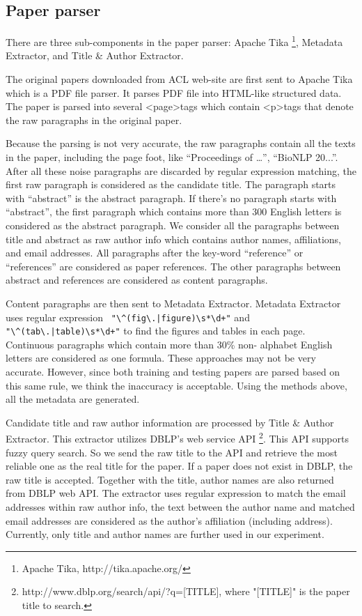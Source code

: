 \documentclass[11pt,letterpaper]{article}
\begin{document}
\subsection{Paper parser}

There are three sub-components in the paper parser: Apache Tika \footnote{Apache Tika, http://tika.apache.org/}, Metadata Extractor, and Title \& Author Extractor. 

The original papers downloaded from ACL web-site are first sent to Apache Tika which is a PDF file parser. It parses PDF file into HTML-like structured data. The paper is parsed into several \textless page\textgreater tags which contain \textless p\textgreater tags that denote the raw paragraphs in the original paper. 

Because the parsing is not very accurate, the raw paragraphs contain all the texts in the paper, including the page foot, like ``Proceedings of …'', ``BioNLP 20...''. After all these noise paragraphs are discarded by regular expression matching, the first raw paragraph is considered as the candidate title. The paragraph starts with ``abstract'' is the abstract paragraph. If there's no paragraph starts with ``abstract'', the first paragraph which contains more than 300 English letters is considered as the abstract paragraph. 
We consider all the paragraphs between title and abstract as raw author info which contains author names, affiliations, and email addresses. All paragraphs after the key-word ``reference'' or ``references'' are considered as paper references. The other paragraphs between abstract and references are considered as content paragraphs. 

Content paragraphs are then sent to Metadata Extractor. Metadata Extractor uses regular expression \verb- "\^(fig\.|figure)\s*\d+"- and  \verb-"\^(tab\.|table)\s*\d+"- to find the figures and tables in each page. Continuous paragraphs which contain more than 30\% non- alphabet English letters are considered as one formula. These approaches may not be very accurate. However, since both training and testing papers are parsed based on this same rule, we think the inaccuracy is acceptable. Using the methods above, all the metadata are generated. 

Candidate title and raw author information are processed by Title \& Author Extractor. This extractor utilizes DBLP's web service API \footnote{http://www.dblp.org/search/api/?q=[TITLE], where "[TITLE]" is the paper title to search.}. This API supports fuzzy query search. So we send the raw title to the API and retrieve the most reliable one as the real title for the paper. If a paper does not exist in DBLP, the raw title is accepted. Together with the title, author names are also returned from DBLP web API. The extractor uses regular expression to match the email addresses within raw author info, the text between the author name and matched email addresses are considered as the author's affiliation (including address). Currently, only title and author names are further used in our experiment. 
\end{document}
